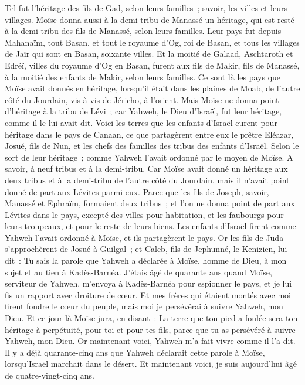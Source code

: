 \begin{multicols}{2}
Tel fut l'héritage des fils de Gad, selon leurs familles~; savoir, les villes et leurs villages.
Moïse donna aussi à la demi-tribu de Manassé un héritage, qui est resté à la demi-tribu des fils de Manassé, selon leurs familles.
Leur pays fut depuis Mahanaïm, tout Basan, et tout le royaume d'Og, roi de Basan, et tous les villages de Jaïr qui sont en Basan, soixante villes.
Et la moitié de Galaad, Aschtaroth et Edréï, villes du royaume d'Og en Basan, furent aux fils de Makir, fils de Manassé, à la moitié des enfants de Makir, selon leurs familles.
Ce sont là les pays que Moïse avait donnés en héritage, lorsqu'il était dans les plaines de Moab, de l'autre côté du Jourdain, vis-à-vis de Jéricho, à l'orient.
Mais Moïse ne donna point d'héritage à la tribu de Lévi~; car Yahweh, le Dieu d'Israël, fut leur héritage, comme il le lui avait dit.
\VerseOne{}Voici les terres que les enfants d'Israël eurent pour héritage dans le pays de Canaan, ce que partagèrent entre eux le prêtre Eléazar, Josué, fils de Nun, et les chefs des familles des tribus des enfants d'Israël.
Selon le sort de leur héritage~; comme Yahweh l'avait ordonné par le moyen de Moïse. A savoir, à neuf tribus et à la demi-tribu.
Car Moïse avait donné un héritage aux deux tribus et à la demi-tribu de l'autre côté du Jourdain, mais il n'avait point donné de part aux Lévites parmi eux.
Parce que les fils de Joseph, savoir, Manassé et Ephraïm, formaient deux tribus~; et l'on ne donna point de part aux Lévites dans le pays, excepté des villes pour habitation, et les faubourgs pour leurs troupeaux, et pour le reste de leurs biens.
Les enfants d'Israël firent comme Yahweh l'avait ordonné à Moïse, et ils partagèrent le pays.
Or les fils de Juda s'approchèrent de Josué à Guilgal~; et Caleb, fils de Jephunné, le Kenizien, lui dit~: Tu sais la parole que Yahweh a déclarée à Moïse, homme de Dieu, à mon sujet et au tien à Kadès-Barnéa.
J'étais âgé de quarante ans quand Moïse, serviteur de Yahweh, m'envoya à Kadès-Barnéa pour espionner le pays, et je lui fis un rapport avec droiture de cœur.
Et mes frères qui étaient montés avec moi firent fondre le cœur du peuple, mais moi je persévérai à suivre Yahweh, mon Dieu.
Et ce jour-là Moïse jura, en disant~: La terre que ton pied a foulée sera ton héritage à perpétuité, pour toi et pour tes fils, parce que tu as persévéré à suivre Yahweh, mon Dieu.
Or maintenant voici, Yahweh m'a fait vivre comme il l'a dit. Il y a déjà quarante-cinq ans que Yahweh déclarait cette parole à Moïse, lorsqu'Israël marchait dans le désert. Et maintenant voici, je suis aujourd'hui âgé de quatre-vingt-cinq ans.

\end{multicols}
